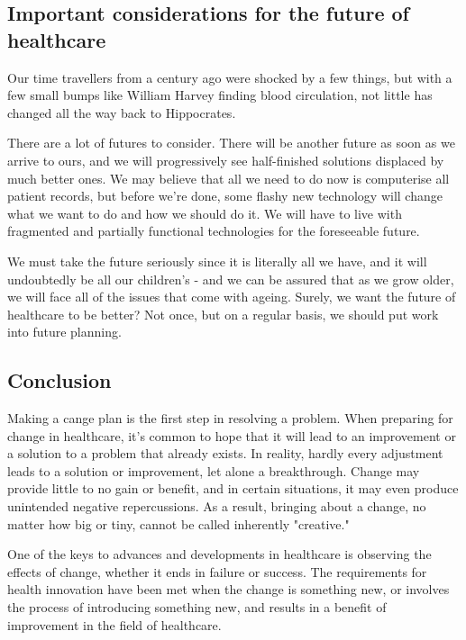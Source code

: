 \documentclass[12pt]{article}
\begin{document}
\subsection{Important considerations for the future of healthcare}

Our time travellers from a century ago were shocked by a few things, but with a few small bumps like William Harvey finding blood circulation, not little has changed all the way back to Hippocrates.


There are a lot of futures to consider. There will be another future as soon as we arrive to ours, and we will progressively see half-finished solutions displaced by much better ones. We may believe that all we need to do now is computerise all patient records, but before we're done, some flashy new technology will change what we want to do and how we should do it. We will have to live with fragmented and partially functional technologies for the foreseeable future.

We must take the future seriously since it is literally all we have, and it will undoubtedly be all our children's - and we can be assured that as we grow older, we will face all of the issues that come with ageing. Surely, we want the future of healthcare to be better? Not once, but on a regular basis, we should put work into future planning.
\subsection{Conclusion}
Making a cange plan is the first step in resolving a problem. When preparing for change in healthcare, it's common to hope that it will lead to an improvement or a solution to a problem that already exists. In reality, hardly every adjustment leads to a solution or improvement, let alone a breakthrough. Change may provide little to no gain or benefit, and in certain situations, it may even produce unintended negative repercussions. As a result, bringing about a change, no matter how big or tiny, cannot be called inherently "creative."

One of the keys to advances and developments in healthcare is observing the effects of change, whether it ends in failure or success. The requirements for health innovation have been met when the change is something new, or involves the process of introducing something new, and results in a benefit of improvement in the field of healthcare.
\end{document}
